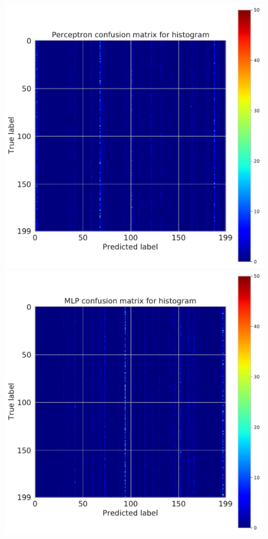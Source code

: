 \documentclass[11pt]{article}
\begin{document}
\begin{figure}[H]
\begin{minipage}[c]{0.5\textwidth}
\includegraphics[width=1\linewidth]{figures/Tiny_Image/CM__ppn_histogram.pdf}
\end{minipage}
\begin{minipage}[c]{0.5\textwidth}
\includegraphics[width=1\linewidth]{figures/Tiny_Image/CM__MLP_histogram.pdf}

\end{minipage}
\end{figure}
\end{document}
